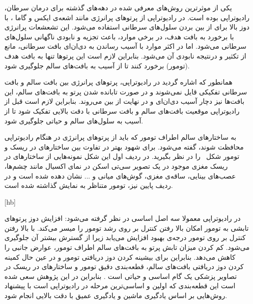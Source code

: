 

یکی از موثرترین روش‌های معرفی شده در دهه‌های گذشته برای درمان سرطان، رادیوتراپی	 بوده است. در رادیوتراپی از پرتوهای پرانرژی مانند اشعه‌ی ایکس	 و گاما	، با دوز	 بالا برای از بین بردن سلول‌های سرطانی استفاده می‌شود. این تشعشعات پرانرژی با برخورد به بافت هدف، در برخی موارد، باعث تجزیه و نابودی ناگهانی سلول‌های سرطانی می‌شود. اما در اکثر موارد با آسیب رساندن به دی‌ان‌ای	 بافت سرطانی، مانع از تکثیر و درنتیجه نابودی آن می‌شود. بنابراین لازم است این پرتوها تنها به بافت هدف (تومور) برخورد کنند تا از آسیب به بافت‌های سالم جلوگیری شود.





همانطور که اشاره گردید در رادیوتراپی، پرتوهای پرانرژی بین بافت سالم و بافت سرطانی تفکیکی قایل نمی‌شوند و در صورت تابانده شدن پرتو به بافت‌های سالم، این بافت‌ها نیز دچار آسیب دی‌ان‌ای و در نهایت از بین می‌روند. بنابراین لازم است قبل از رادیوتراپی موقعیت بافت‌های سالم و بافت سرطانی با دقت بالایی تفکیک شود تا از آسیب به سلول‌های سالم و حیاتی جلوگیری شود.

به ساختارهای سالم اطراف تومور که باید از پرتوهای پرانرژی در هنگام رادیوتراپی محافظت شوند، گفته می‌شود. برای شهود بهتر در تفاوت بین ساختارهای در ریسک و تومور شکل‌~ را در نظر بگیرید. در ردیف اول این شکل نمونه‌هایی از ساختارهای در ریسک مغزی موجود در یک تصویر سی‌تی اسکن در نمای اکسیال مانند چشم‌ها، عصب‌های بینایی، ساقه‌ی مغزی، گوش‌های میانی و ... نشان دهده شده است و در ردیف پایین نیز، تومور متناظر به نمایش گذاشته شده است.

[hb]

در رادیوتراپی معمولا سه اصل اساسی در نظر گرفته می‌شود:
 افزایش دوز پرتوهای تابشی به تومور امکان بالا رفتن کنترل بر روی رشد تومور را میسر می‌کند.
 با بالا رفتن کنترل بر روی تومور درجه‌ی بهبود افزایش می‌یابد زیرا از گسترش بیشتر آن جلوگیری می‌شود.
 کم کردن میزان تابش پرتو به بافت‌های سالم اطراف تومور، عوارض جانبی را کاهش می‌دهد.
بنابراین برای بیشینه کردن دوز دریافتی تومور و در عین حال کمینه کردن دوز دریافتی بافت‌های سالم، قطعه‌بندی دقیق تومور و ساختارهای در ریسک در تصاویر پزشکی یک گام اساسی و حیاتی است . بنابراین در این پژوهش سعی شده است این قطعه‌بندی که اولین و اساسی‌ترین مرحله در رادیوتراپی است با پیشنهاد روش‌هایی بر اساس یادگیری ماشین و یادگیری عمیق با دقت بالایی انجام شود.
	

